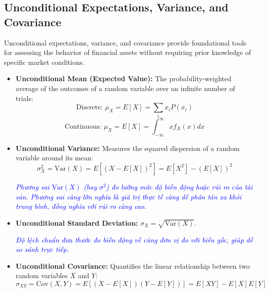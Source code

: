 \subsection{Unconditional Expectations, Variance, and Covariance}
	\label{subsec:Unconditional Expectations, Variance, and Covariance}
Unconditional expectations, variance, and covariance provide foundational tools for assessing the behavior of financial assets without requiring prior knowledge of specific market conditions.
\begin{itemize}
	\item \textbf{Unconditional Mean (Expected Value):} The probability-weighted average of the outcomes of a random variable over an infinite number of trials:
	\begin{equation}
		\text{Discrete: } \mu_X = E[X] = \sum_i x_i P(x_i)
		\label{eq:discrete_expected_value_m6}
	\end{equation}
	\begin{equation}
		\text{Continuous: } \mu_X = E[X] = \int_{-\infty}^{\infty} x f_X(x) dx
		\label{eq:continuous_expected_value_m6}
	\end{equation}
	

	\item \textbf{Unconditional Variance:} Measures the squared dispersion of a random variable around its mean:
	\begin{equation}
		\sigma_X^2 = \text{Var}(X) = E[(X - E[X])^2] = E[X^2] - (E[X])^2
		\label{eq:unconditional_variance_m6}
	\end{equation}
	
	\textcolor{blue}{\textit{Phương sai $\text{Var}(X)$ (hay $\sigma^2$) đo lường mức độ biến động hoặc rủi ro của tài sản. Phương sai càng lớn nghĩa là giá trị thực tế càng dễ phân tán xa khỏi trung bình, đồng nghĩa với rủi ro càng cao.}}

	\item \textbf{Unconditional Standard Deviation:} $\sigma_X = \sqrt{\text{Var}(X)}$.
	
	\textcolor{blue}{\textit{Độ lệch chuẩn đưa thước đo biến động về cùng đơn vị đo với biến gốc, giúp dễ so sánh trực tiếp.}}

	\item \textbf{Unconditional Covariance:} Quantifies the linear relationship between two random variables $X$ and $Y$:
	\begin{equation}
		\sigma_{XY} = \text{Cov}(X, Y) = E[(X - E[X])(Y - E[Y])] = E[XY] - E[X]E[Y]
		\label{eq:unconditional_covariance_m6}
	\end{equation}
\end{itemize}

